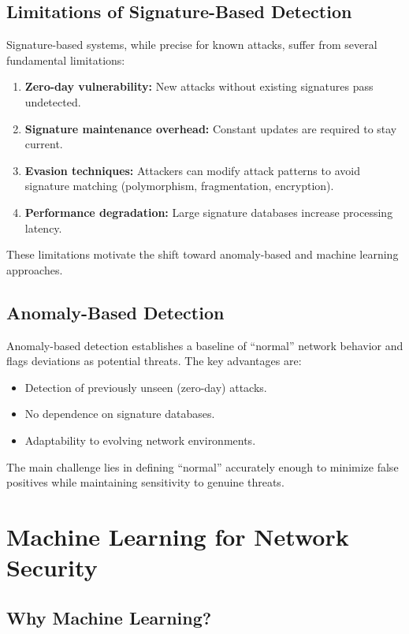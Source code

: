 \documentclass[12pt,a4paper,twoside]{report}
\begin{document}
\subsection{Limitations of Signature-Based Detection}

Signature-based systems, while precise for known attacks, suffer from several fundamental limitations:

\begin{enumerate}[leftmargin=*]
    \item \textbf{Zero-day vulnerability:} New attacks without existing signatures pass undetected.
    \item \textbf{Signature maintenance overhead:} Constant updates are required to stay current.
    \item \textbf{Evasion techniques:} Attackers can modify attack patterns to avoid signature matching (polymorphism, fragmentation, encryption).
    \item \textbf{Performance degradation:} Large signature databases increase processing latency.
\end{enumerate}

These limitations motivate the shift toward anomaly-based and machine learning approaches.

\subsection{Anomaly-Based Detection}

Anomaly-based detection establishes a baseline of ``normal'' network behavior and flags deviations as potential threats. The key advantages are:

\begin{itemize}
    \item Detection of previously unseen (zero-day) attacks.
    \item No dependence on signature databases.
    \item Adaptability to evolving network environments.
\end{itemize}

The main challenge lies in defining ``normal'' accurately enough to minimize false positives while maintaining sensitivity to genuine threats.

\section{Machine Learning for Network Security}

\subsection{Why Machine Learning?}
\end{document}
